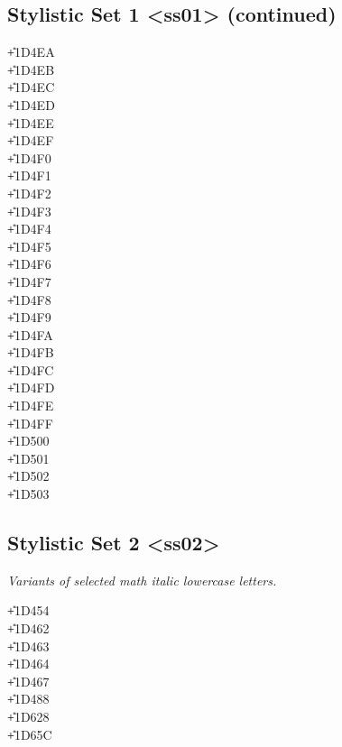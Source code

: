 \begin{multicols}{3}
\subsection{Stylistic Set 1 <ss01> (continued)}

\begin{ssubs}{02}
\U+1D4EA\\  %
\U+1D4EB\\  %
\U+1D4EC\\  %
\U+1D4ED\\  %
\U+1D4EE\\  %
\U+1D4EF\\  %
\U+1D4F0\\  %
\U+1D4F1\\  %
\U+1D4F2\\  %
\U+1D4F3\\  %
\U+1D4F4\\  %
\U+1D4F5\\  %
\U+1D4F6\\  %
\U+1D4F7\\  %
\U+1D4F8\\  %
\U+1D4F9\\  %
\U+1D4FA\\  %
\U+1D4FB\\  %
\U+1D4FC\\  %
\U+1D4FD\\  %
\U+1D4FE\\  %
\U+1D4FF\\  %
\U+1D500\\  %
\U+1D501\\  %
\U+1D502\\  %
\U+1D503\\  %
\end{ssubs}

\subsection{Stylistic Set 2 <ss02>}

\emph{Variants of selected math italic lowercase letters.}

\begin{ssubs}{02}
\U+1D454\\
\U+1D462\\
\U+1D463\\
\U+1D464\\
\U+1D467\\
\U+1D488\\
\U+1D628\\
\U+1D65C\\
\end{ssubs}


\end{multicols}
